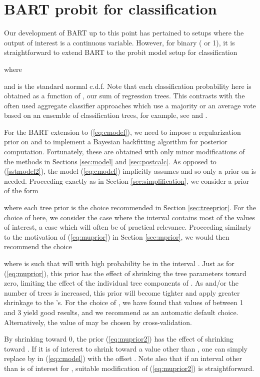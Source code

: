 \documentclass[aoas,nameyear,dvips]{arximspdf}
\newcommand{\citeasnoun}[1]{\citet{#1}}
\begin{document}
\section{BART probit for classification}\label{sec:classification}

Our development of BART up to this point has pertained to setups where
the output of interest  is a continuous variable.  However, for
binary  ( or 1), it is straightforward to extend BART to the
probit model setup for classification

where

and  is the standard normal c.d.f.  Note that each
classification probability  here is obtained as a function of
, our sum of regression trees.  This contrasts with the often
used aggregate classifier approaches which use a majority or an average
vote based on an ensemble of classification trees, for example, see
\citeasnoun{AmitGema1997} and \citeasnoun{Bre2001}.

For the BART extension to (\ref{eq:cmodel}), we need to impose a
regularization prior on  and to implement a Bayesian backfitting
algorithm for posterior computation.  Fortunately, these are obtained
with only minor modifications of the methods in Sections
\ref{sec:model} and \ref{sec:postcalc}. As opposed to
(\ref{sstmodel2}), the model (\ref{eq:cmodel}) implicitly assumes
 and so only a prior on  is
needed.  Proceeding exactly as in Section \ref{sec:simplification}, we
consider a prior of the form

where each tree prior  is the choice recommended in  Section
\ref{sec:treeprior}.   For the choice of  here, we
consider the case where the interval  contains
most of the  values of interest, a case which will often be of
practical relevance.  Proceeding similarly to the motivation of
(\ref{eq:muprior}) in Section \ref{sec:mprior}, we would then recommend
the choice

where  is such that  will with high probability be in the interval .
Just as for (\ref{eq:muprior}), this prior has the effect of shrinking the tree parameters
 toward zero, limiting the effect of the individual
tree components of .  As  and/or the number of trees  is increased, this
prior will become tighter and apply greater shrinkage to the
's.  For the choice of , we have found
that values of  between 1 and 3 yield good results, and we
recommend  as an automatic default choice. Alternatively,
the value of  may be chosen by cross-validation.

By shrinking  toward 0, the prior (\ref{eq:muprior2}) has the effect of shrinking
 toward .  If it is of interest to shrink toward
a value  other than , one can simply replace  by  in
(\ref{eq:cmodel}) with the offset .  Note also that if an interval other than 
is of interest for , suitable modification of (\ref{eq:muprior2}) is straightforward.
\end{document}
